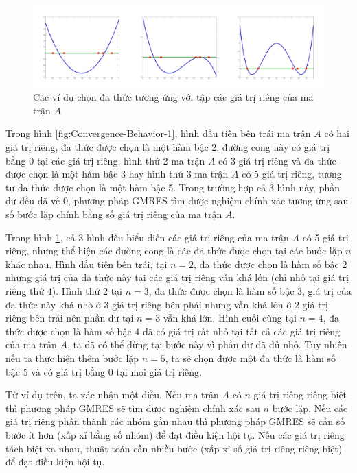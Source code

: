 \documentclass[14pt, a4paper]{article}
\numberwithin{equation}{section}
\numberwithin{algorithm}{section}
\numberwithin{figure}{section}
\numberwithin{dl}{section}
\numberwithin{md}{section}
\numberwithin{bd}{section}
\numberwithin{dn}{section}
\begin{document}
\begin{figure}[h!] \centering

    \includegraphics[scale=0.5]{Convergence-Behavior-2.jpg}
    \caption{Các ví dụ chọn đa thức tương ứng với tập các giá trị riêng của ma trận $A$}

    \label{fig:Convergence-Behavior-2}
\end{figure}

Trong hình \ref{fig:Convergence-Behavior-1}, hình đầu tiên bên trái ma trận $A$ có hai giá trị riêng, đa thức được chọn là một hàm bậc 2, đường cong này có giá trị bằng 0 tại các giá trị riêng, hình thứ 2 ma trận $A$ có 3 giá trị riêng và đa thức được chọn là một hàm bậc 3 hay hình thứ 3 ma trận $A$ có 5 giá trị riêng, tương tự đa thức được chọn là một hàm bậc 5. Trong trường hợp cả 3 hình này, phần dư đều đã về 0, phương pháp GMRES tìm được nghiệm chính xác tương ứng sau số bước lặp chính bằng số giá trị riêng của ma trận $A$.

Trong hình \ref{fig:Convergence-Behavior-2}, cả 3 hình đều biểu diễn các giá trị riêng của ma trận $A$ có 5 giá trị riêng, nhưng thể hiện các đường cong là các đa thức được chọn tại các bước lặp $n$ khác nhau. Hình đầu tiên bên trái, tại $n=2$, đa thức được chọn là hàm số bậc 2 nhưng giá trị của đa thức này tại các giá trị riêng vẫn khá lớn (chỉ nhỏ tại giá trị riêng thứ 4). Hình thứ 2 tại $n=3$, đa thức được chọn là hàm số bậc 3, giá trị của đa thức này khá nhỏ ở 3 giá trị riêng bên phải nhưng vẫn khá lớn ở 2 giá trị riêng bên trái nên phần dư tại $n=3$ vẫn khá lớn. Hình cuối cùng tại $n=4$, đa thức được chọn là hàm số bậc 4 đã có giá trị rất nhỏ tại tất cả các giá trị riêng của ma trận $A$, ta đã có thể dừng tại bước này vì phần dư đã đủ nhỏ. Tuy nhiên nếu ta thực hiện thêm bước lặp $n=5$, ta sẽ chọn được một đa thức là hàm số bậc 5 và có giá trị bằng 0 tại mọi giá trị riêng.

Từ ví dụ trên, ta xác nhận một điều. Nếu ma trận $A$ có $n$ giá trị riêng riêng biệt thì phương pháp GMRES sẽ tìm được nghiệm chính xác sau $n$ bước lặp. Nếu các giá trị riêng phân thành các nhóm gần nhau thì phương pháp GMRES sẽ cần số bước ít hơn (xấp xỉ bằng số nhóm) để đạt điều kiện hội tụ. Nếu các giá trị riêng tách biệt xa nhau, thuật toán cần nhiều bước (xấp xỉ số giá trị riêng riêng biệt) để đạt điều kiện hội tụ.
\end{document}
